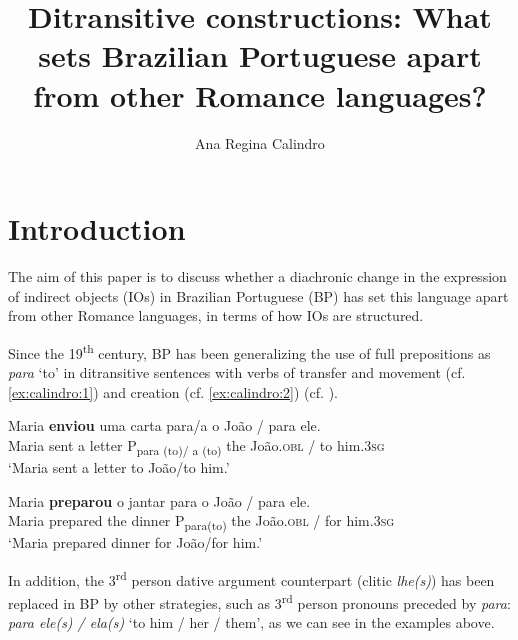 \documentclass[output=paper,colorlinks,citecolor=brown,modfonts,nonflat]{langsci/langscibook}
\author{Ana Regina Calindro\affiliation{Federal University of Rio de Janeiro (UFRJ)}}
\title{Ditransitive constructions: What sets Brazilian Portuguese apart from other Romance languages?}
\begin{document}
\maketitle
{}

\section{Introduction}\label{sec:calindro:1}

The aim of this paper is to discuss whether a diachronic change in the expression of indirect objects (IOs) in Brazilian Portuguese (BP) has set this language apart from other Romance languages, in terms of how IOs are structured.

Since the 19\textsuperscript{th} century, BP has been generalizing the use of full prepositions as \textit{para} ‘to’ in ditransitive sentences with verbs of transfer and movement (cf. \ref{ex:calindro:1}) and creation (cf. \ref{ex:calindro:2}) (cf. \citealt{Freire2005, TorresMoraisBerlinck2006, TorresMoraisSalles2010}).

\ea%
    \label{ex:calindro:1}
    \gll Maria \textbf{enviou}  uma carta  {para/a}   {o} {João}  / {para} {ele}. \\
     Maria sent       a letter      P{\textsubscript{para (to)/ a (to)}}   the João.\textsc{obl}  / to him.\textsc{3sg}  \\
     \glt `Maria sent a letter to João/to him.'
    \z

\ea%
    \label{ex:calindro:2}
    \gll Maria     \textbf{preparou}  o jantar        {para}    {o} {João}  / {para} {ele}.\\
    Maria     prepared  the dinner    P\textsubscript{para(to)} the João.\textsc{obl} / for him.\textsc{3sg} \\
    \glt `Maria prepared dinner for João/for him.'
    \z

In addition, the 3\textsuperscript{rd} person dative argument counterpart (clitic \textit{lhe(s)}) has been replaced in BP by other strategies, such as 3\textsuperscript{rd} person pronouns preceded by \textit{para}:  \textit{para ele(s) / ela(s)} ‘to him / her / them’, as we can see in the examples above.
\end{document}
